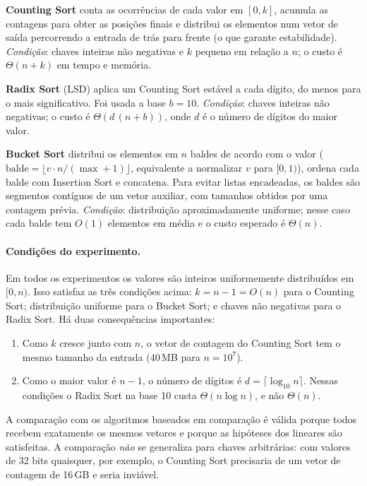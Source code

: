 \documentclass[11pt,a4paper]{article}
\begin{document}
\textbf{Counting Sort} conta as ocorrências de cada valor em $[0,k]$, acumula as contagens para obter
as posições finais e distribui os elementos num vetor de saída percorrendo a entrada de trás para
frente (o que garante estabilidade). \emph{Condição}: chaves inteiras não negativas e $k$
pequeno em relação a $n$; o custo é $\Theta(n+k)$ em tempo e memória.

\textbf{Radix Sort} (LSD) aplica um Counting Sort estável a cada dígito, do menos para o mais
significativo. Foi usada a base $b=10$. \emph{Condição}: chaves inteiras não negativas; o custo é
$\Theta(d\,(n+b))$, onde $d$ é o número de dígitos do maior valor.

\textbf{Bucket Sort} distribui os elementos em $n$ baldes de acordo com o valor
($\text{balde} = \lfloor v \cdot n / (\max+1) \rfloor$, equivalente a normalizar $v$ para $[0,1)$),
ordena cada balde com Insertion Sort e concatena. Para evitar listas encadeadas, os baldes são
segmentos contíguos de um vetor auxiliar, com tamanhos obtidos por uma contagem prévia.
\emph{Condição}: distribuição aproximadamente uniforme; nesse caso cada balde tem $O(1)$ elementos
em média e o custo esperado é $\Theta(n)$.

\paragraph{Condições do experimento.} Em todos os experimentos os valores são inteiros
uniformemente distribuídos em $[0, n)$. Isso satisfaz as três condições acima: $k = n-1 = O(n)$
para o Counting Sort; distribuição uniforme para o Bucket Sort; e chaves não negativas para o
Radix Sort. Há duas consequências importantes:
\begin{enumerate}
  \item Como $k$ cresce junto com $n$, o vetor de contagem do Counting Sort tem o mesmo tamanho da
        entrada (40\,MB para $n=10^7$).
  \item Como o maior valor é $n-1$, o número de dígitos é $d = \lceil \log_{10} n \rceil$. Nessas
        condições o Radix Sort na base 10 custa $\Theta(n \log n)$, e não $\Theta(n)$.
\end{enumerate}
A comparação com os algoritmos baseados em comparação é válida porque todos recebem exatamente os
mesmos vetores e porque as hipóteses dos lineares são satisfeitas. A comparação \emph{não} se
generaliza para chaves arbitrárias: com valores de 32 bits quaisquer, por exemplo, o Counting Sort
precisaria de um vetor de contagem de 16\,GB e seria inviável.
\end{document}
